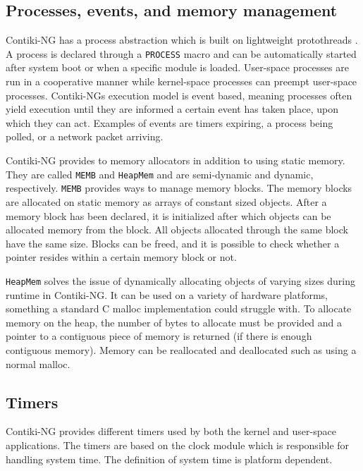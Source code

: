 \documentclass[0-thesis.tex]{subfiles}
\begin{document}
\subsection{Processes, events, and memory management}
\label{ssec:process-event-memory}
Contiki-NG has a process abstraction which is built on lightweight protothreads
\parencite{protothreads}. A process is declared through a \texttt{PROCESS} macro and can
be automatically started after system boot or when a specific module is loaded. User-space
processes are run in a cooperative manner while kernel-space processes can preempt
user-space processes. Contiki-NGs execution model is event based, meaning processes often
yield execution until they are informed a certain event has taken place, upon which they
can act. Examples of events are timers expiring, a process being polled, or a network
packet arriving. 

Contiki-NG provides to memory allocators in addition to using static memory. They are
called \texttt{MEMB} and \texttt{HeapMem} and are semi-dynamic and dynamic, respectively.
\texttt{MEMB} provides ways to manage memory blocks. The memory blocks are allocated on
static memory as arrays of constant sized objects. After a memory block has been declared,
it is initialized after which objects can be allocated memory from the block. All objects
allocated through the same block have the same size. Blocks can be freed, and it is
possible to check whether a pointer resides within a certain memory block or not.

\texttt{HeapMem} solves the issue of dynamically allocating objects of varying sizes
during runtime in Contiki-NG. It can be used on a variety of hardware platforms, something
a standard C malloc implementation could struggle with. To allocate memory on the heap,
the number of bytes to allocate must be provided and a pointer to a contiguous piece of
memory is returned (if there is enough contiguous memory). Memory can be reallocated and
deallocated such as using a normal malloc.

\subsection{Timers}
\label{ssec:timers}
Contiki-NG provides different timers used by both the kernel and user-space applications.
The timers are based on the clock module which is responsible for handling system time.
The definition of system time is platform dependent.
\end{document}
